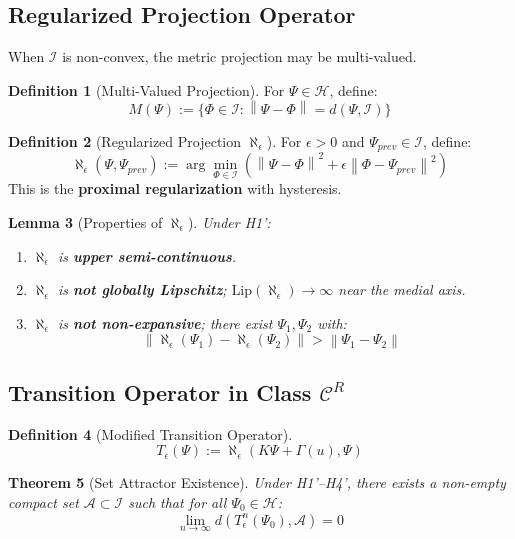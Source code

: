 \documentclass[11pt,a4paper]{article}
\theoremstyle{plain}
\newtheorem{theorem}{Theorem}[section]
\newtheorem{lemma}[theorem]{Lemma}
\theoremstyle{definition}
\newtheorem{definition}[theorem]{Definition}
\newcommand{\Hilb}{\mathcal{H}}
\newcommand{\I}{\mathcal{I}}
\newcommand{\norm}[1]{\left\lVert #1 \right\rVert}
\begin{document}
\subsection{Regularized Projection Operator}

When $\I$ is non-convex, the metric projection may be multi-valued.

\begin{definition}[Multi-Valued Projection]
For $\Psi \in \Hilb$, define:
\[
M(\Psi) := \{\Phi \in \I : \norm{\Psi - \Phi} = d(\Psi, \I)\}
\]
\end{definition}

\begin{definition}[Regularized Projection $\aleph_\epsilon$]
For $\epsilon > 0$ and $\Psi_{prev} \in \I$, define:
\[
\aleph_\epsilon(\Psi, \Psi_{prev}) := \arg\min_{\Phi \in \I} \left( \norm{\Psi - \Phi}^2 + \epsilon \norm{\Phi - \Psi_{prev}}^2 \right)
\]
This is the \textbf{proximal regularization} with hysteresis.
\end{definition}

\begin{lemma}[Properties of $\aleph_\epsilon$]\label{lem:aleph_eps}
Under H1':
\begin{enumerate}
    \item $\aleph_\epsilon$ is \textbf{upper semi-continuous}.
    \item $\aleph_\epsilon$ is \textbf{not globally Lipschitz}; $\text{Lip}(\aleph_\epsilon) \to \infty$ near the medial axis.
    \item $\aleph_\epsilon$ is \textbf{not non-expansive}; there exist $\Psi_1, \Psi_2$ with:
    \[
    \norm{\aleph_\epsilon(\Psi_1) - \aleph_\epsilon(\Psi_2)} > \norm{\Psi_1 - \Psi_2}
    \]
\end{enumerate}
\end{lemma}

\subsection{Transition Operator in Class $\mathscr{C}^R$}

\begin{definition}[Modified Transition Operator]
\[
T_\epsilon(\Psi) := \aleph_\epsilon(K\Psi + \Gamma(u), \Psi)
\]
\end{definition}

\begin{theorem}[Set Attractor Existence]\label{thm:setattractor}
Under H1'--H4', there exists a non-empty compact set $\mathcal{A} \subset \I$ such that for all $\Psi_0 \in \Hilb$:
\[
\lim_{n \to \infty} d(T_\epsilon^n(\Psi_0), \mathcal{A}) = 0
\]
\end{theorem}
\end{document}
